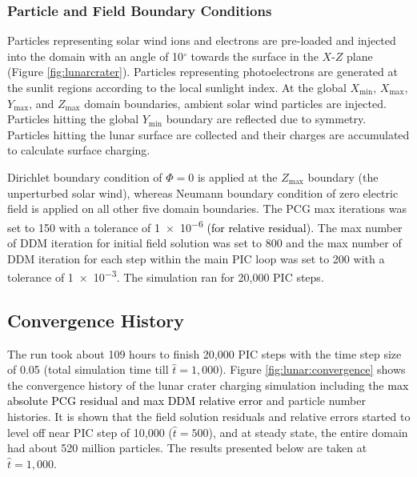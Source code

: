 \documentclass{siamart171218}
\newcommand{\coloring}[1]{\textcolor{black}{#1}} %
\begin{document}
\subsubsection{Particle and Field Boundary Conditions}

Particles representing solar wind ions and electrons
are pre-loaded and injected into the domain
with an angle of 10$^{\circ}$ towards the surface
in the $X$-$Z$ plane (Figure \ref{fig:lunarcrater}).
Particles representing photoelectrons are generated at the sunlit regions
according to the local sunlight index.
At the global $X_{\min}$, $X_{\max}$, $Y_{\max}$, and $Z_{\max}$ domain boundaries,
ambient solar wind particles are injected.
Particles hitting the global $Y_{\min}$ boundary are reflected due to symmetry.
Particles hitting the lunar surface are collected and their charges are accumulated
to calculate surface charging.

Dirichlet boundary condition of $\Phi = 0$ is applied
at the $Z_{\max}$ boundary (the unperturbed solar wind), whereas
Neumann boundary condition of zero electric field is applied on
all other five domain boundaries.
The PCG max iterations was set to 150 with a tolerance of \num{1e-6}
\coloring{(for relative residual)}.
The max number of DDM iteration for initial field solution was set to 800
and the max number of DDM iteration for each step
within the main PIC loop
was set to 200 with a tolerance of \num{1e-3}.
The simulation ran for 20,000 PIC steps.


\subsection{Convergence History}


The run took about 109 hours to finish 20,000 PIC steps with the time step size of
0.05 (total simulation time till $\hat{t} = 1,000$).
Figure \ref{fig:lunar:convergence} shows the convergence history
of the lunar crater charging simulation
including the \coloring{max absolute PCG residual and max DDM relative error}
and particle number histories.
It is shown that the field solution residuals and relative errors started to level off
near PIC step of 10,000 ($\hat{t} = 500$),
and at steady state, the entire domain had about 520 million particles.
The results presented below are taken at $\hat{t} = 1,000$.
\end{document}
